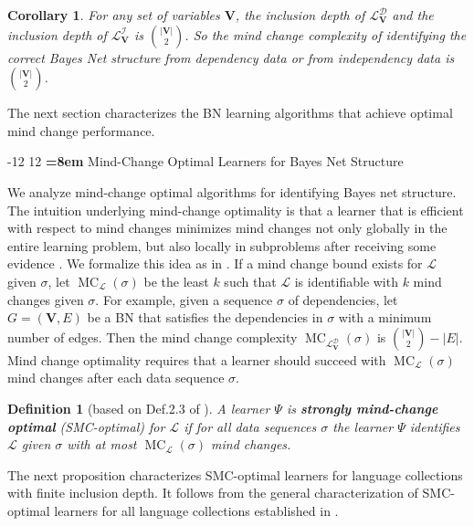 \documentclass{elsarticle}%
\makeatletter
\renewcommand\section{\@startsection {section}{1}{\z@}%
  {-12\p@ \@plus -4\p@ \@minus -4\p@}%
                       {12\p@ \@plus 4\p@ \@minus 4\p@}%
                                   {\normalfont\large\bfseries\boldmath
                                   \rightskip=\z@ \@plus 8em\pretolerance=10000 }}
\newtheorem{corollary}[theorem]{Corollary}
\newtheorem{definition}[theorem]{Definition}
\DeclareMathOperator{\SEQ}{SEQ}
\DeclareMathOperator{\MC}{MC}
\renewcommand{\L}{\mathcal{L}}
\newcommand{\D}{\mathcal{D}}
\newcommand{\I}{\mathcal{I}}
\makeatother
\begin{document}
\begin{corollary}
For any set of variables $\mathbf{V}$, the inclusion depth of $\L_{\mathbf{V}}^{\D}
$ and the inclusion depth of $\L_{\mathbf{V}}^{\I}
$ is ${\binom{|\mathbf{V}|}{2}}$. So the mind change complexity of identifying the
correct Bayes Net structure from dependency data or from independency data is ${\binom{|\mathbf{V}|}{2}}$.
\end{corollary}
%
The  next section characterizes the BN learning algorithms that achieve optimal mind change performance.

\section{Mind-Change Optimal Learners for Bayes Net Structure} \label{sec:learners}

We analyze
mind-change optimal algorithms for identifying Bayes net structure. The
intuition underlying mind-change optimality is that a learner that is
efficient with respect to mind changes minimizes mind changes not only
globally in the entire learning problem, but also locally in subproblems after
receiving some evidence \cite{luo06:_mind_chang_effic_learn,luo05:_mind_chang_effic_learn,kelly04:_justif_truth_findin_effic}.
We
formalize this idea as in \cite[Def.2.3]{luo06:_mind_chang_effic_learn}. If a mind change
bound exists for $\L$ given $\sigma$, let $\MC_{\L%
}(\sigma)$ be the least $k$ such that $\L$ is identifiable with $k$
mind changes given $\sigma$. For example, given a sequence $\sigma$ of
dependencies, let $G=(\mathbf{V},E)$ be a BN that %
satisfies
the
dependencies in $\sigma$ with a minimum number of edges. Then the mind change
complexity $\MC_{\L_{\mathbf{V}}^{\D}}(\sigma)$ is ${\binom{|\mathbf{V}|}{2}-|E|}$. Mind change optimality requires that a learner should succeed with $\MC_{\L}(\sigma)$ mind
changes after each data sequence $\sigma$. %

\begin{definition}[based on Def.2.3 of \cite{luo06:_mind_chang_effic_learn}]
A learner $\Psi$ is \textbf{strongly mind-change optimal} (SMC-optimal) for
$\L$ if for all data sequences $\sigma$ the learner $\Psi$ identifies
$\L$ given $\sigma$ with at most $\MC_{\L}(\sigma)$ mind changes.
\end{definition}
%
The next proposition characterizes SMC-optimal learners for language
collections with finite inclusion depth. It follows from the general characterization of SMC-optimal
learners for all language collections established in \cite[Prop.4.1]{luo06:_mind_chang_effic_learn}.
\end{document}
